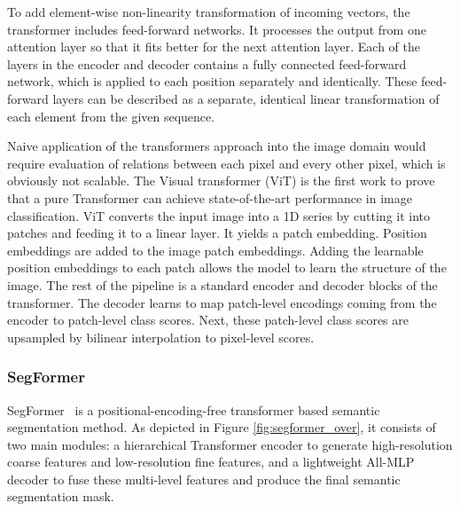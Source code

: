 To add element-wise non-linearity transformation of incoming vectors, 
the transformer includes feed-forward networks.
It processes the output from one attention layer so that it fits better for the next attention layer.
Each of the layers in the encoder and decoder contains a fully
connected feed-forward network, which is applied to each position separately and identically.
These feed-forward layers can be described as a separate, identical linear transformation of each element from the given sequence.

Naive application of the transformers approach into the image domain would require evaluation of relations between each pixel and every other pixel, which is obviously not scalable. The Visual transformer (ViT) \cite{dosovitskiy2020image} is the first work to prove that a pure Transformer can achieve state-of-the-art performance in image classification. ViT converts the input image into a 1D series by cutting it into patches and feeding it to a linear layer. It yields a patch embedding. Position embeddings are added to the image patch embeddings. Adding the learnable position embeddings to each patch allows the model to learn the structure of the image. The rest of the pipeline is a standard encoder and decoder blocks of the transformer.  The decoder learns to map patch-level encodings coming from the encoder to patch-level class scores. Next, these patch-level class scores are upsampled by bilinear interpolation to pixel-level scores.

\subsubsection{SegFormer}
SegFormer~\cite{xie2021segformer} is a positional-encoding-free transformer based semantic segmentation method. As depicted in Figure \ref{fig:segformer_over}, it consists of two main modules: a hierarchical Transformer encoder to generate high-resolution coarse features and low-resolution fine features, and a lightweight All-MLP decoder to fuse these multi-level features and produce the final semantic segmentation mask. 

